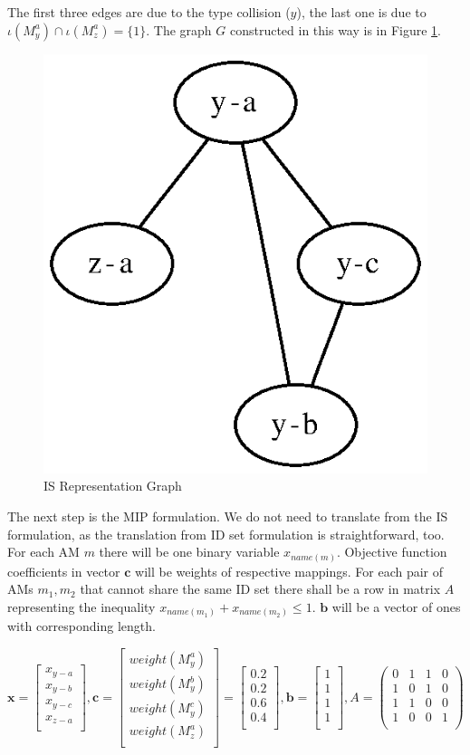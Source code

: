 The first three edges are due to the type collision ($y$), the last one is due to $\iota(M_{y}^{a}) \cap \iota(M_{z}^{a}) = \{1\}$. The graph $G$ constructed in this way is in Figure \ref{image-mip-is-graph}.

\begin{figure}
  \caption{IS Representation Graph}
  \label{image-mip-is-graph}
  \centering
	\includegraphics[width=.25\textwidth]{images/is-representation}
\end{figure}

The next step is the MIP formulation. We do not need to translate from the IS formulation, as the translation from ID set formulation is straightforward, too. For each AM $m$ there will be one binary variable $x_{name(m)}$. Objective function coefficients in vector $\mathbf{c}$ will be weights of respective mappings. For each pair of AMs $m_1, m_2$ that cannot share the same ID set there shall be a row in matrix $A$ representing the inequality $x_{name(m_1)} + x_{name(m_2)} \leqslant 1$. $\mathbf{b}$ will be a vector of ones with corresponding length.

\[
\mathbf{x} =
\begin{bmatrix}
x_{y-a} \\
x_{y-b} \\
x_{y-c} \\
x_{z-a} \\
\end{bmatrix},
\mathbf{c} = 
\begin{bmatrix}
weight(M_{y}^{a}) \\
weight(M_{y}^{b}) \\
weight(M_{y}^{c}) \\
weight(M_{z}^{a}) \\
\end{bmatrix} =
\begin{bmatrix}
0.2 \\
0.2 \\
0.6 \\
0.4 \\
\end{bmatrix},
\mathbf{b} =
\begin{bmatrix}
1 \\
1 \\
1 \\
1 \\
\end{bmatrix},
A =
\begin{pmatrix}
0 & 1 & 1 & 0 \\
1 & 0 & 1 & 0 \\
1 & 1 & 0 & 0 \\
1 & 0 & 0 & 1 \\
\end{pmatrix}
\]

